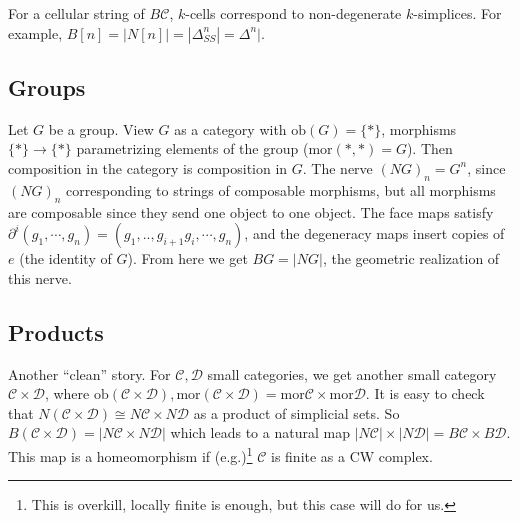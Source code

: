 For a cellular string of $B\mathcal{C} $, $k$-cells correspond to non-degenerate  $k$-simplices. For example, $B[n]=|N[n]|=|\Delta ^n _{S S}|={\Delta ^n } |$.

\subsection{Groups}
Let $G$ be a group. View $G$ as a category with $\mathrm{ob}(G)= \{*\} $, morphisms $\{*\} \to \{*\} $ parametrizing elements of the group ($\mathrm{mor}(*,*)=G$). Then composition in the category is composition in $G$. The nerve $(NG)_n =G^n $, since $(NG)_n $ corresponding to strings of composable morphisms, but all morphisms are composable since they send one object to one object. The face maps satisfy $\partial ^i (g_1, \cdots ,g_n )= (g_1, ..,g_{i+1}g_i , \cdots ,g_n )$, and the degeneracy maps insert copies of $e$ (the identity of  $G$). From here we get $BG=|NG|$, the geometric realization of this nerve.

\subsection{Products}
Another ``clean'' story. For $\mathcal{C,D} $ small categories, we get another small category $\mathcal{C \times D} $, where $\mathrm{ob}(\mathcal{C \times D} ), \mathrm{mor}(\mathcal{C\times D} )=\mathrm{mor}\mathcal{C}\times \mathrm{mor}\mathcal{D}  $. It is easy to check that $N(\mathcal{C\times D} ) \cong N\mathcal{C} \times N\mathcal{D} $ as a product of simplicial sets. So $B(\mathcal{C \times D} )=|N\mathcal{C} \times N\mathcal{D}| $ which leads to a natural map $|N\mathcal{C} |\times |N\mathcal{D} |=B\mathcal{C} \times B\mathcal{D} $. This map is a homeomorphism if (e.g.)\footnote{This is overkill, locally finite is enough, but this case will do for us.} $\mathcal{C} $ is finite as a CW complex. 

